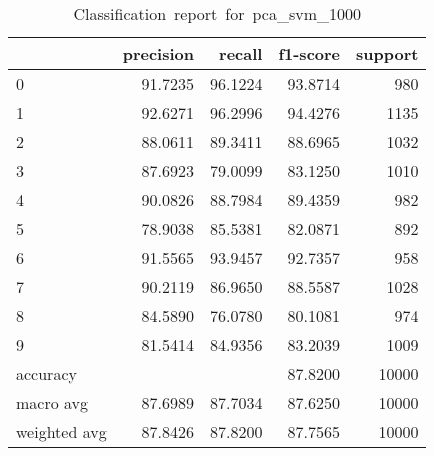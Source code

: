 \begin{table}[htb!]
    \centering
    \begin{tabular}{lrrrr}
        \toprule
                     & precision & recall  & f1-score & support \\
        \midrule
        0            & 91.7235   & 96.1224 & 93.8714  & 980     \\
        1            & 92.6271   & 96.2996 & 94.4276  & 1135    \\
        2            & 88.0611   & 89.3411 & 88.6965  & 1032    \\
        3            & 87.6923   & 79.0099 & 83.1250  & 1010    \\
        4            & 90.0826   & 88.7984 & 89.4359  & 982     \\
        5            & 78.9038   & 85.5381 & 82.0871  & 892     \\
        6            & 91.5565   & 93.9457 & 92.7357  & 958     \\
        7            & 90.2119   & 86.9650 & 88.5587  & 1028    \\
        8            & 84.5890   & 76.0780 & 80.1081  & 974     \\
        9            & 81.5414   & 84.9356 & 83.2039  & 1009    \\
        accuracy     &           &         & 87.8200  & 10000   \\
        macro avg    & 87.6989   & 87.7034 & 87.6250  & 10000   \\
        weighted avg & 87.8426   & 87.8200 & 87.7565  & 10000   \\
        \bottomrule
    \end{tabular}
    \caption{Classification\ report\ for\ pca\_svm\_1000}
    \label{tab:classification-report-pca_svm_1000}
\end{table}

